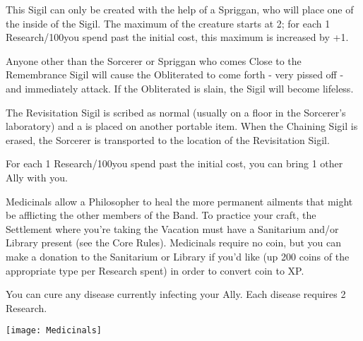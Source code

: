 {\cbreak


This Sigil can only be created with the help of a Spriggan, who will place one of the  inside of the Sigil.  The maximum \HD of the creature starts at 2; for each 1 Research/100\AU you spend past the initial cost, this maximum is increased by +1.

Anyone other than the Sorcerer or Spriggan who comes Close to the Remembrance Sigil will cause the Obliterated to come forth - very pissed off - and immediately attack.  If the Obliterated is slain, the Sigil will become lifeless.

\cbreak


The Revisitation Sigil is scribed as normal (usually on a floor in the Sorcerer's laboratory) and a  is placed on another portable item.  When the Chaining Sigil is erased, the Sorcerer is transported to the location of the Revisitation Sigil.  

For each 1 Research/100\AU you spend past the initial cost, you can bring 1 other Ally with you.


\newpage


Medicinals allow a Philosopher to heal the more permanent ailments that might be afflicting the other members of the Band.   To practice your craft, the Settlement where you're taking the Vacation must have a Sanitarium and/or Library present (see the Core Rules).  Medicinals require no coin, but you can make a donation to the Sanitarium or Library if you'd like (up 200 coins of the appropriate type per Research spent) in order to convert coin to XP.



You can cure any disease currently infecting your Ally.  Each disease requires 2 Research.

  \begin{center}
  \texttt{[image: Medicinals]}
  \end{center}

}
